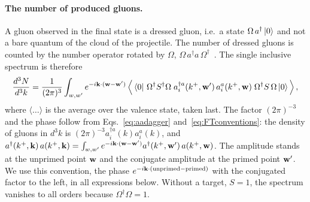 \paragraph{The number of produced gluons.} A gluon observed in the final state is a dressed gluon, i.e.\ a state $\Omega\,a^\dagger\ket0$ and not a bare quantum of the cloud of the projectile. The number of dressed gluons is counted by the number operator rotated by $\Omega$, $\Omega\,a^\dagger a\,\Omega^\dagger$~\cite{Kovner:2006wr}. The single inclusive spectrum is therefore
\begin{align}\label{eq:observable}
\frac{d^3N}{d^3k}=\frac{1}{(2\pi)^3}\int_{w,w'}e^{-i\mathbf{k}\cdot(\mathbf{w}-\mathbf{w}')}\,
\Big\langle\bra0\,\Omega^\dagger S^\dagger\Omega\;a^{\dagger a}_i(k^+,\mathbf{w}')\,a^a_i(k^+,\mathbf{w})\;\Omega^\dagger S\,\Omega\ket0\Big\rangle\,,
\end{align}
where $\langle\dots\rangle$ is the average over the valence state, taken last. The factor $(2\pi)^{-3}$ and the phase follow from Eqs.~\eqref{eq:aadagger} and~\eqref{eq:FTconventions}: the density of gluons in $d^3k$ is $(2\pi)^{-3}a^{\dagger a}_i(k)a^a_i(k)$, and $a^{\dagger}(k^+,\mathbf{k})\,a(k^+,\mathbf{k})=\int_{w,w'}e^{-i\mathbf{k}\cdot(\mathbf{w}-\mathbf{w}')}a^{\dagger}(k^+,\mathbf{w}')\,a(k^+,\mathbf{w})$. The amplitude stands at the unprimed point $\mathbf{w}$ and the conjugate amplitude at the primed point $\mathbf{w}'$. We use this convention, the phase $e^{-i\mathbf{k}\cdot(\text{unprimed}-\text{primed})}$ with the conjugated factor to the left, in all expressions below. Without a target, $S=1$, the spectrum vanishes to all orders because $\Omega^\dagger\Omega=1$.

